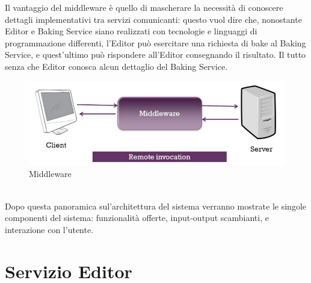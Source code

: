 Il vantaggio del middleware è quello di mascherare la necessità di conoscere dettagli implementativi tra servizi comunicanti: questo vuol dire che, nonostante Editor e Baking Service siano realizzati con tecnologie e linguaggi di programmazione differenti, l’Editor può esercitare una richiesta di bake al Baking Service, e quest’ultimo può rispondere all’Editor consegnando il risultato. Il tutto senza che Editor conosca alcun dettaglio del Baking Service.
\\
\begin{figure}[htb]
 \centering
 \includegraphics[width=0.8\linewidth]{images/chapter_architettura_sistema/as_middleware.png}\hfill
 \caption[Middleware]{Middleware}
 \label{fig:as_middleware}
\end{figure}
\\
Dopo questa panoramica sul’architettura del sistema verranno mostrate le singole componenti del sistema: funzionalità offerte, input-output scambianti, e interazione con l’utente. 

\section{Servizio Editor}
\label{sec:chapter_architettura_sistema_il_servizio_editor}

